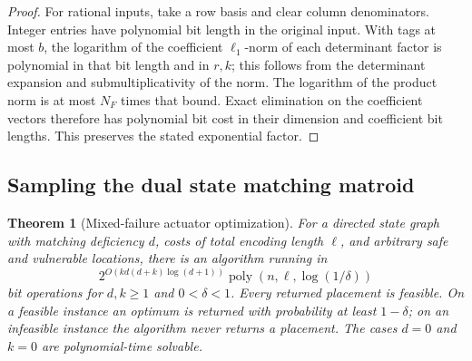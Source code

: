 \documentclass[11pt]{article}
\newtheorem{theorem}{Theorem}[section]
\theoremstyle{definition}
\theoremstyle{remark}\newtheorem{remark}[theorem]{Remark}
\begin{document}
\begin{proof}
For rational inputs, take a row basis and clear column
denominators. Integer entries have polynomial bit length
in the original input. With tags at most $b$, the logarithm
of the coefficient $\ell_1$-norm of each determinant factor
is polynomial in that bit length and in $r,k$; this follows
from the determinant expansion and submultiplicativity of the
norm. The logarithm of the product norm is at most $N_F$
times that bound. Exact elimination on the coefficient vectors
therefore has polynomial bit cost in their dimension and
coefficient bit lengths. This preserves the stated exponential
factor.
\end{proof}

\subsection{Sampling the dual state matching matroid}
\begin{theorem}[Mixed-failure actuator optimization]\label{thm:random-control}
For a directed state graph with matching deficiency $d$, costs
of total encoding length $\ell$, and arbitrary safe and vulnerable
locations, there is an algorithm running in
\[
 2^{O(kd(d+k)\log(d+1))}
 \operatorname{poly}(n,\ell,\log(1/\delta))
\]
bit operations for $d,k\ge1$ and $0<\delta<1$.
Every returned placement is feasible. On a feasible instance
an optimum is returned with probability at least $1-\delta$;
on an infeasible instance the algorithm never returns a placement.
The cases $d=0$ and $k=0$ are polynomial-time solvable.
\end{theorem}
\end{document}
